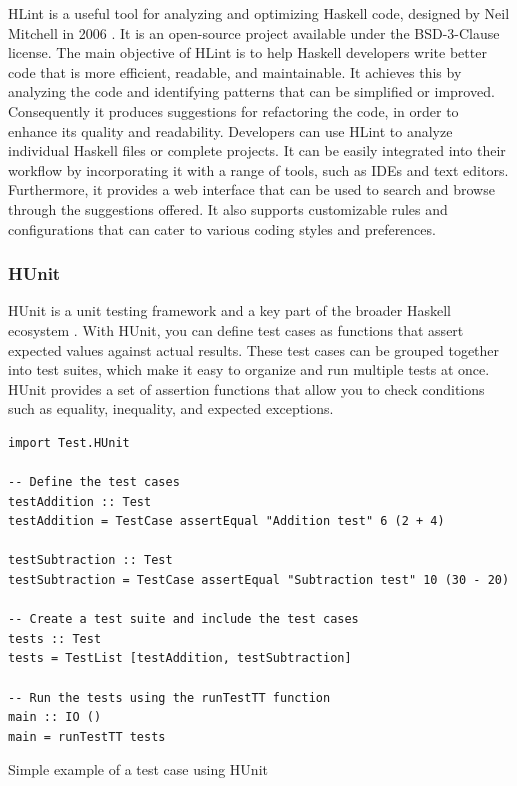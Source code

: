 \documentclass[a4paper, titlepage, twoside]{article}
\begin{document}
HLint is a useful tool for analyzing and optimizing Haskell code, designed by Neil Mitchell in 2006 \autocite{mitchellHLint2023}. It is an open-source project available under the BSD-3-Clause license. The main objective of HLint is to help Haskell developers write better code that is more efficient, readable, and maintainable. It achieves this by analyzing the code and identifying patterns that can be simplified or improved. Consequently it produces suggestions for refactoring the code, in order to enhance its quality and readability. Developers can use HLint to analyze individual Haskell files or complete projects. It can be easily integrated into their workflow by incorporating it with a range of tools, such as IDEs and text editors. Furthermore, it provides a web interface that can be used to search and browse through the suggestions offered. It also supports customizable rules and configurations that can cater to various coding styles and preferences.

\subsubsection{HUnit}
\label{sec:org437b139}

HUnit is a unit testing framework and a key part of the broader Haskell ecosystem \autocite{HUnitUserGuide2023}. With HUnit, you can define test cases as functions that assert expected values against actual results. These test cases can be grouped together into test suites, which make it easy to organize and run multiple tests at once. HUnit provides a set of assertion functions that allow you to check conditions such as equality, inequality, and expected exceptions.

\begin{listing}[htbp]
\begin{verbatim}
import Test.HUnit

-- Define the test cases
testAddition :: Test
testAddition = TestCase assertEqual "Addition test" 6 (2 + 4)

testSubtraction :: Test
testSubtraction = TestCase assertEqual "Subtraction test" 10 (30 - 20)

-- Create a test suite and include the test cases
tests :: Test
tests = TestList [testAddition, testSubtraction]

-- Run the tests using the runTestTT function
main :: IO ()
main = runTestTT tests
\end{verbatim}
\caption{\label{lst:orgbbda403}Simple example of a test case using HUnit}
\end{listing}
\end{document}
